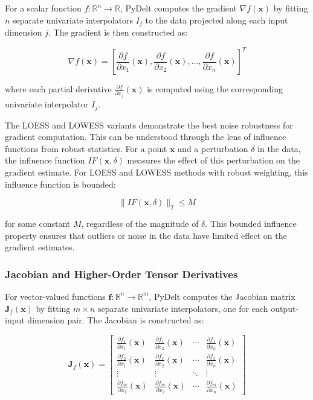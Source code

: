 \documentclass[10pt,journal,compsoc]{IEEEtran}
\begin{document}
For a scalar function $f: \mathbb{R}^n \rightarrow \mathbb{R}$, PyDelt computes the gradient $\nabla f(\mathbf{x})$ by fitting $n$ separate univariate interpolators $I_j$ to the data projected along each input dimension $j$. The gradient is then constructed as:

\begin{equation}
    \nabla f(\mathbf{x}) = \left[ \frac{\partial f}{\partial x_1}(\mathbf{x}), \frac{\partial f}{\partial x_2}(\mathbf{x}), \ldots, \frac{\partial f}{\partial x_n}(\mathbf{x}) \right]^T
\end{equation}

where each partial derivative $\frac{\partial f}{\partial x_j}(\mathbf{x})$ is computed using the corresponding univariate interpolator $I_j$.

The LOESS and LOWESS variants demonstrate the best noise robustness for gradient computation. This can be understood through the lens of influence functions from robust statistics. For a point $\mathbf{x}$ and a perturbation $\delta$ in the data, the influence function $IF(\mathbf{x}, \delta)$ measures the effect of this perturbation on the gradient estimate. For LOESS and LOWESS methods with robust weighting, this influence function is bounded:

\begin{equation}
    \|IF(\mathbf{x}, \delta)\|_2 \leq M
\end{equation}

for some constant $M$, regardless of the magnitude of $\delta$. This bounded influence property ensures that outliers or noise in the data have limited effect on the gradient estimates.

\subsubsection{Jacobian and Higher-Order Tensor Derivatives}

For vector-valued functions $\mathbf{f}: \mathbb{R}^n \rightarrow \mathbb{R}^m$, PyDelt computes the Jacobian matrix $\mathbf{J}_f(\mathbf{x})$ by fitting $m \times n$ separate univariate interpolators, one for each output-input dimension pair. The Jacobian is constructed as:

\begin{equation}
    \mathbf{J}_f(\mathbf{x}) = \begin{bmatrix}
    \frac{\partial f_1}{\partial x_1}(\mathbf{x}) & \frac{\partial f_1}{\partial x_2}(\mathbf{x}) & \cdots & \frac{\partial f_1}{\partial x_n}(\mathbf{x}) \\
    \frac{\partial f_2}{\partial x_1}(\mathbf{x}) & \frac{\partial f_2}{\partial x_2}(\mathbf{x}) & \cdots & \frac{\partial f_2}{\partial x_n}(\mathbf{x}) \\
    \vdots & \vdots & \ddots & \vdots \\
    \frac{\partial f_m}{\partial x_1}(\mathbf{x}) & \frac{\partial f_m}{\partial x_2}(\mathbf{x}) & \cdots & \frac{\partial f_m}{\partial x_n}(\mathbf{x})
    \end{bmatrix}
\end{equation}
\end{document}
